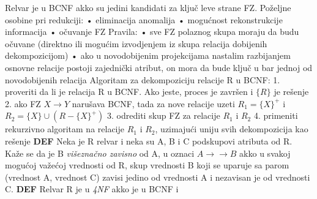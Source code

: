 \documentclass{article}
\begin{document}
Relvar je u BCNF akko su jedini kandidati za ključ leve
strane FZ.
\newline
Poželjne osobine pri redukciji:
\newline \hspace*{0.4cm}• eliminacija anomalija
\newline \hspace*{0.4cm}• mogućnost rekonstrukcije 
informacija
\newline \hspace*{0.4cm}• očuvanje FZ
\newline
Pravila:
\newline \hspace*{0.4cm}• sve FZ polaznog skupa moraju da
budu očuvane (direktno ili mogućim izvodjenjem iz skupa
relacija dobijenih dekompozicijom)
\newline \hspace*{0.4cm}• ako u novodobijenim projekcijama
nastalim razbijanjem osnovne relacije postoji zajednički
atribut, on mora da bude ključ u bar jednoj od novodobijenih
relacija
\newline
Algoritam za dekompoziciju relacije R u BCNF:
\newline \hspace*{0.4cm}1. proveriti da li je relacija R u
BCNF. Ako jeste, proces je završen i $\{R\}$ je rešenje
\newline \hspace*{0.4cm}2. ako FZ $X \rightarrow Y$ narušava
BCNF, tada za nove relacije uzeti $R_1 = \{X\}^+$ i \newline
$R_2 = \{X\} \cup (R - \{X\}^+)$
\newline \hspace*{0.4cm}3. odrediti skup FZ za relacije $R_1$
i $R_2$
\newline \hspace*{0.4cm}4. primeniti rekurzivno algoritam na
relacije $R_1$ i $R_2$, uzimajući uniju svih dekompozicija
kao rešenje
\vspace{0.2cm}\newline
\textbf{DEF} Neka je R relvar i neka su A, B i C podskupovi
atributa od R. Kaže se da je B \textit{višeznačno zavisno} od
A, u oznaci $A \rightarrow\rightarrow B$ akko u svakoj
mogućoj važećoj vrednosti od R, skup vrednosti B koji se
uparuje sa parom (vrednost A, vrednost C) zavisi jedino od
vrednosti A i nezavisan je od vrednosti C.
\vspace{0.2cm}\newline
\textbf{DEF} Relvar R je u \textit{4NF} akko je u BCNF i
\end{document}
